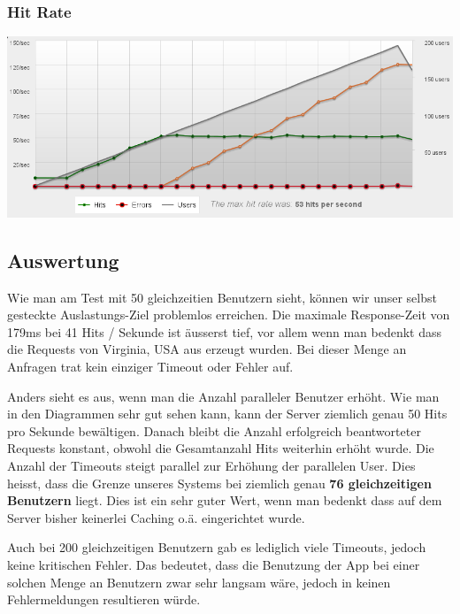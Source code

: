 \documentclass[10pt,a4paper]{scrartcl}
\begin{document}
\subsubsection*{Hit Rate}

\includegraphics[width=\textwidth]{loadtests/hitrate-200.png}


\subsection{Auswertung}

Wie man am Test mit 50 gleichzeitien Benutzern sieht, können wir unser selbst gesteckte Auslastungs-Ziel
problemlos erreichen. Die maximale Response-Zeit von 179ms bei 41 Hits / Sekunde ist äusserst tief,
vor allem wenn man bedenkt dass die Requests von Virginia, USA aus erzeugt wurden. Bei dieser Menge
an Anfragen trat kein einziger Timeout oder Fehler auf.

Anders sieht es aus, wenn man die Anzahl paralleler Benutzer erhöht. Wie man in den Diagrammen sehr
gut sehen kann, kann der Server ziemlich genau 50 Hits pro Sekunde bewältigen. Danach bleibt die
Anzahl erfolgreich beantworteter Requests konstant, obwohl die Gesamtanzahl Hits weiterhin erhöht
wurde. Die Anzahl der Timeouts steigt parallel zur Erhöhung der parallelen User. Dies heisst, dass
die Grenze unseres Systems bei ziemlich genau \textbf{76 gleichzeitigen Benutzern} liegt. Dies ist
ein sehr guter Wert, wenn man bedenkt dass auf dem Server bisher keinerlei Caching o.ä. eingerichtet
wurde.

Auch bei 200 gleichzeitigen Benutzern gab es lediglich viele Timeouts, jedoch keine kritischen
Fehler. Das bedeutet, dass die Benutzung der App bei einer solchen Menge an Benutzern zwar sehr
langsam wäre, jedoch in keinen Fehlermeldungen resultieren würde.
\end{document}
